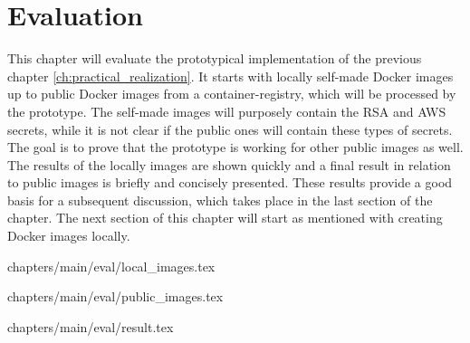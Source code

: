 \chapter{Evaluation}
\label{ch:eval}
This chapter will evaluate the prototypical implementation of the previous chapter \ref{ch:practical_realization}. 
It starts with locally self-made Docker images up to public Docker images from a container-registry, which will be processed by the prototype. The self-made images will purposely contain the RSA and AWS secrets, while it is not clear if the public ones will contain these types of secrets. The goal is to prove that the prototype is working for other public images as well.
The results of the locally images are shown quickly and a final result in relation to public images is briefly and concisely presented.
These results provide a good basis for a subsequent discussion, which takes place in the last section of the chapter.
The next section of this chapter will start as mentioned with creating Docker images locally.

 {chapters/main/eval/local_images.tex}

 {chapters/main/eval/public_images.tex}

 {chapters/main/eval/result.tex}